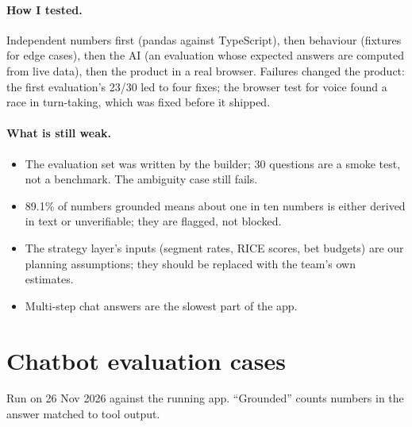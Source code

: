 \documentclass[11pt,a4paper]{article}
\begin{document}
\paragraph{How I tested.} Independent numbers first (pandas against TypeScript), then behaviour (fixtures for edge cases), then the AI (an evaluation whose expected answers are computed from live data), then the product in a real browser. Failures changed the product: the first evaluation's 23/30 led to four fixes; the browser test for voice found a race in turn-taking, which was fixed before it shipped.

\paragraph{What is still weak.}
\begin{itemize}
  \item The evaluation set was written by the builder; 30 questions are a smoke test, not a benchmark. The ambiguity case still fails.
  \item 89.1\% of numbers grounded means about one in ten numbers is either derived in text or unverifiable; they are flagged, not blocked.
  \item The strategy layer's inputs (segment rates, RICE scores, bet budgets) are our planning assumptions; they should be replaced with the team's own estimates.
  \item Multi-step chat answers are the slowest part of the app.
\end{itemize}

\appendix
\section{Chatbot evaluation cases}\label{app:eval}
Run on 26 Nov 2026 against the running app. ``Grounded'' counts numbers in the answer matched to tool output.
\end{document}
